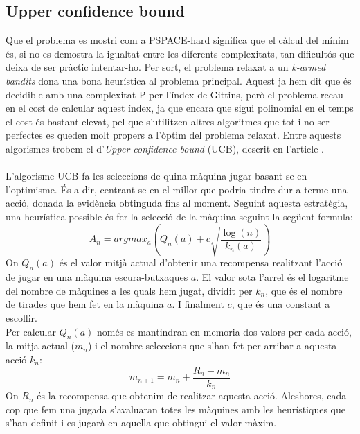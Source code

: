 
\subsection{Upper confidence bound}
Que el problema es mostri com a PSPACE-hard significa que el càlcul del mínim és, si no es demostra la igualtat entre
les diferents complexitats, tan dificultós que deixa de ser pràctic intentar-ho. Per sort, el problema relaxat a un
\textit{k-armed bandits} dona una bona heurística al problema principal. Aquest ja hem dit que és decidible amb una complexitat P
per l'índex de Gittins, però el problema recau en el cost de calcular aquest índex, ja que encara que sigui polinomial en el temps
el cost és bastant elevat, pel que s'utilitzen altres algoritmes que tot i no ser perfectes es queden molt propers a l'òptim del
problema relaxat. Entre aquests algorismes trobem el d'\textit{Upper confidence bound} (UCB), descrit en l'article \cite{ucb}. \\
\\
L'algorisme UCB fa les seleccions de quina màquina jugar basant-se en l'optimisme. És a dir, centrant-se en el millor que podria tindre dur a terme una acció, donada la evidència obtinguda fins al moment.
Seguint aquesta estratègia, una heurística possible és fer la selecció de la màquina seguint la següent formula:
\[
A_n = argmax_a(Q_n(a) + c\sqrt{\frac{\log (n)}{k_n(a)}})
\]
On $Q_n(a)$ és el valor mitjà actual d'obtenir una recompensa realitzant l'acció de jugar en una màquina escura-butxaques $a$.
El valor sota l'arrel és el logaritme del nombre de màquines a les quals hem jugat, dividit per $k_n$,
que és el nombre de tirades que hem fet en la màquina $a$. I finalment $c$, que és una constant a escollir.\\
Per calcular $Q_n(a)$ només es mantindran en memoria dos valors per cada acció, la
mitja actual ($m_n$) i el nombre seleccions que s'han fet per arribar a aquesta acció $k_n$: %
\[
m_{n+1} = m_n + \frac{R_n - m_n}{k_n}
\]
On $R_n$ és la recompensa que obtenim de realitzar aquesta acció.
Aleshores, cada cop que fem una jugada s'avaluaran totes les màquines amb les heurístiques que s'han definit i es jugarà en aquella que obtingui el valor màxim.

